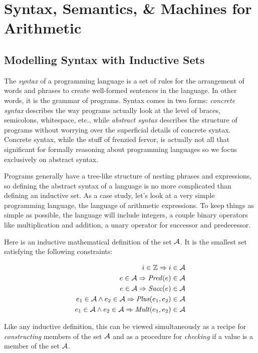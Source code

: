 \section{Syntax, Semantics, \& Machines for Arithmetic}

\subsection{Modelling Syntax with Inductive Sets}

The \emph{syntax} of a programming language is a set of rules for the
arrangement of words and phrases to create well-formed sentences in
the language.  In other words, it is the grammar of programs.  Syntax
comes in two forms: \emph{concrete syntax} describes the way programs
actually look at the level of braces, semicolons, whitespace, etc.,
while \emph{abstract syntax} describes the structure of programs
without worrying over the superficial details of concrete syntax.
Concrete syntax, while the stuff of frenzied fervor, is actually not
all that significant for formally reasoning about programming
languages so we focus exclusively on abstract syntax.

Programs generally have a tree-like structure of nesting phrases and
expressions, so defining the abstract syntax of a language is no more
complicated than defining an inductive set.
%
As a case study, let's look at a very simple programming language, the
language of arithmetic expressions.  To keep things as simple as
possible, the language will include integers, a couple binary
operators like multiplication and addition, a unary operator for
successor and predecessor.

Here is an inductive mathematical definition of the set
$\mathcal{A}$.  It is the smallest set satisfying the following
constraints:

\begin{align}
i \in \mathbb{Z} \Rightarrow i \in \mathcal{A}\\
e \in \mathcal{A} \Rightarrow \mathit{Pred}(e) \in \mathcal{A}\\
e \in \mathcal{A} \Rightarrow \mathit{Succ}(e) \in \mathcal{A}\\
e_1 \in \mathcal{A} \wedge e_2 \in \mathcal{A} \Rightarrow \mathit{Plus}(e_1,e_2) \in \mathcal{A}\\
e_1 \in \mathcal{A} \wedge e_2 \in \mathcal{A} \Rightarrow \mathit{Mult}(e_1,e_2) \in \mathcal{A}
\end{align}


Like any inductive definition, this can be viewed simultaneously as a
recipe for \emph{constructing} members of the set $\mathcal{A}$ and as a
procedure for \emph{checking} if a value is a member of the set $\mathcal{A}$.

